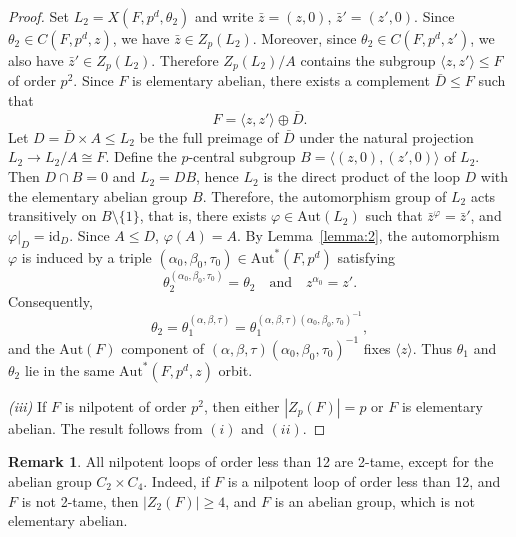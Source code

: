 \documentclass[12pt,a4paper]{amsart}
\theoremstyle{definition}
\newtheorem{remark}[theorem]{Remark}
\begin{document}
\begin{proof}
Set $L_{2}=X(F,p^{d},\theta_{2})$ and write $\bar z=(z,0)$, $\bar{z}'=(z',0)$.
Since $\theta_{2}\in C(F,p^{d},z)$, we have $\bar z\in Z_{p}(L_{2})$.
Moreover, since $\theta_{2}\in C(F,p^{d},z')$, we also have
$\bar z'\in Z_{p}(L_{2})$.
Therefore $Z_{p}(L_{2})/A$ contains the subgroup
$\langle z,z'\rangle\le F$ of order $p^2$. Since $F$ is elementary abelian, there exists a complement
$\bar D\le F$ such that
\[
F=\langle z,z'\rangle \oplus \bar D.
\]
Let $D=\bar D \times A \le L_{2}$ be the full preimage of $\bar D$ under the natural projection $L_{2}\to L_{2}/A\cong F$. Define the $p$-central subgroup $B=\langle (z,0), (z',0) \rangle$ of $L_2$. Then $D\cap B=0$ and $L_{2}=DB$, hence $L_2$ is the direct product of the loop $D$ with the elementary abelian group $B$. Therefore, the automorphism group of $L_{2}$ acts transitively on $B\setminus \{1\}$, that is, there exists $\varphi\in\mathrm{Aut}(L_{2})$ such that
$\bar z^{\varphi}=\bar z'$, and $\varphi|_D=\mathrm{id}_D$.
Since $A\leq D$, $\varphi(A)=A$. By Lemma~\ref{lemma:2}, the automorphism $\varphi$ is induced by a triple 
$(\alpha_{0},\beta_{0},\tau_{0})\in\mathrm{Aut}^{\!*}(F,p^{d})$ satisfying
\[
\theta_{2}^{(\alpha_{0},\beta_{0},\tau_{0})}=\theta_{2}
\quad\text{and}\quad
z^{\alpha_{0}}=z'.
\]
Consequently,
\[
\theta_{2}
=\theta_{1}^{(\alpha,\beta,\tau)}
=\theta_{1}^{(\alpha,\beta,\tau)(\alpha_{0},\beta_{0},\tau_{0})^{-1}},
\]
and the $\mathrm{Aut}(F)$ component of
$(\alpha,\beta,\tau)(\alpha_{0},\beta_{0},\tau_{0})^{-1}$
fixes $\langle z \rangle$.
Thus $\theta_{1}$ and $\theta_{2}$ lie in the same
$\mathrm{Aut}^{\!*}(F,p^{d},z)$ orbit.

\noindent\textit{(iii)} If $F$ is nilpotent of order $p^2$, then either $|Z_p(F)|=p$ or $F$ is elementary abelian. The result follows from $(i)$ and $(ii)$. 
\end{proof}

\begin{remark}
All nilpotent loops of order less than 12 are 2-tame, except for the abelian group $C_2\times C_4$. Indeed, if $F$ is a nilpotent loop of order less than 12, and $F$ is not 2-tame, then $|Z_2(F)|\geq 4$, and $F$ is an abelian group, which is not elementary abelian. 
\end{remark}
\end{document}
